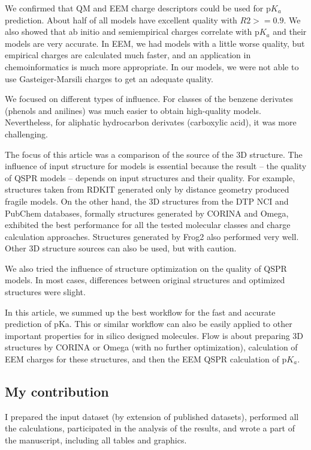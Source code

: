 We confirmed that QM and EEM charge descriptors could be used for p$K_a$
prediction. About half of all models have excellent quality with $R2 >= 0.9$.
We also showed that ab initio and semiempirical charges correlate with p$K_a$
and their models are very accurate. In EEM, we had models with a little worse
quality, but empirical charges are calculated much faster, and an application
in chemoinformatics is much more appropriate. In our models, we were not able
to use Gasteiger-Marsili charges to get an adequate quality. 

We focused on different types of influence. For classes of the benzene
derivates (phenols and anilines) was much easier to obtain high-quality models.
Nevertheless, for aliphatic hydrocarbon derivates (carboxylic acid), it was more
challenging.

The focus of this article was a comparison of the source of the 3D structure.
The influence of input structure for models is essential because
the result -- the quality of QSPR models -- depends on input structures and
their quality. For example, structures taken from RDKIT generated only by
distance geometry produced fragile models. On the other hand, the 3D structures
from the DTP NCI and PubChem databases, formally structures generated by CORINA
and Omega, exhibited the best performance for all the tested molecular classes
and charge calculation approaches. Structures generated by Frog2 also performed
very well. Other 3D structure sources can also be used, but with caution.

We also tried the influence of structure optimization on the quality of QSPR
models. In most cases, differences between original structures and optimized
structures were slight. 

In this article, we summed up the best workflow for the fast and accurate
prediction of pKa. This or similar workflow can also be easily applied to other
important properties for in silico designed molecules. Flow is about preparing
3D structures by CORINA or Omega (with no further optimization), calculation of
EEM charges for these structures, and then the EEM QSPR calculation of p$K_a$.

\subsection{My contribution}

I prepared the input dataset (by extension of published datasets), performed
all the calculations, participated in the analysis of the results, and wrote
a part of the manuscript, including all tables and graphics.

